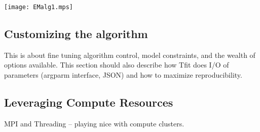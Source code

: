 \documentclass[11pt]{article}
\begin{document}
\texttt{[image: EMalg1.mps]}

\subsection{Customizing the algorithm}
This is about fine tuning algorithm control, model constraints, and 
the wealth of options available.   This section should also describe 
how Tfit does I/O of parameters (argparm interface, JSON) and how
to maximize reproducibility. 

\subsection{Leveraging Compute Resources}
MPI and Threading -- playing nice with compute clusters.

\small{
  
  {}
}
\end{document}

